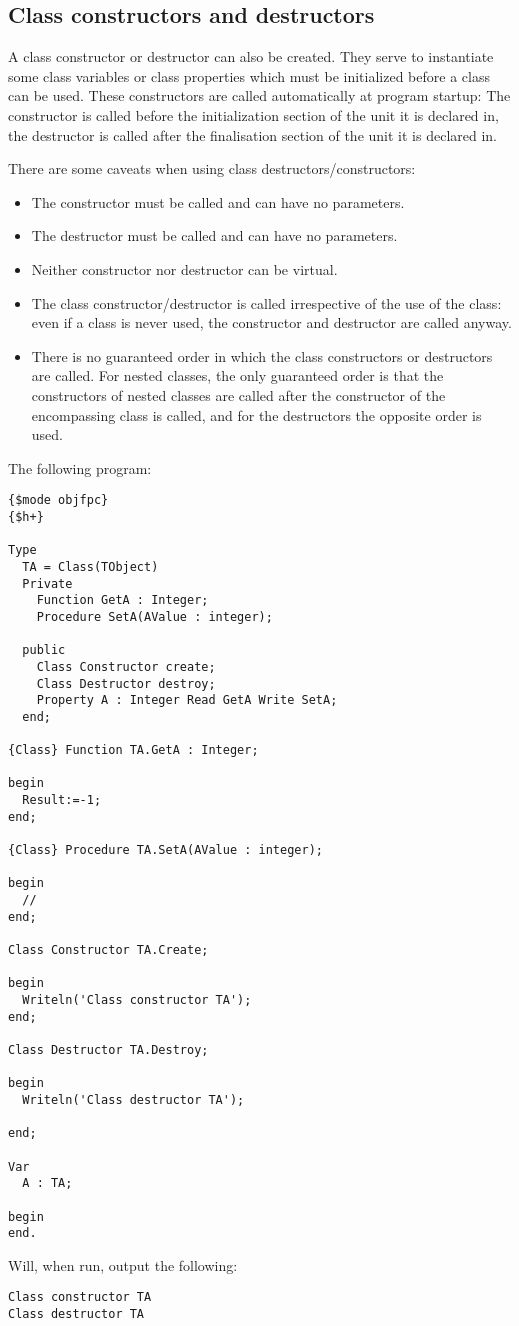 \subsection{Class constructors and destructors}
A class constructor or destructor can also be created. They serve to instantiate some class variables or class properties which must be initialized before a class can be used.
These constructors are called automatically at program startup: The constructor is called before the initialization section of the unit it is declared in, the destructor is 
called after the finalisation section of the unit it is declared in. 

There are some caveats when using class destructors/constructors:
\begin{itemize}
\item The constructor must be called  and can have no parameters.
\item The destructor must be called  and can have no parameters.
\item Neither constructor nor destructor can be virtual.
\item The class constructor/destructor is called irrespective of the use of the class: even if a class is never used, the constructor and destructor are called anyway.
\item There is no guaranteed order in which the class constructors or destructors are called. 
For nested classes, the only guaranteed order is that the constructors of
nested classes are called after the constructor of the encompassing class is
called, and for the destructors the opposite order is used.
\end{itemize}
 
The following program:

\begin{verbatim}
{$mode objfpc}
{$h+}

Type
  TA = Class(TObject)
  Private
    Function GetA : Integer;
    Procedure SetA(AValue : integer);

  public
    Class Constructor create;
    Class Destructor destroy;
    Property A : Integer Read GetA Write SetA;
  end;

{Class} Function TA.GetA : Integer;

begin
  Result:=-1;
end;

{Class} Procedure TA.SetA(AValue : integer);

begin
  // 
end;

Class Constructor TA.Create;

begin
  Writeln('Class constructor TA');
end;

Class Destructor TA.Destroy;

begin
  Writeln('Class destructor TA');

end;

Var
  A : TA;

begin
end.
\end{verbatim}
Will, when run, output the following:
\begin{verbatim}
Class constructor TA
Class destructor TA
\end{verbatim}


